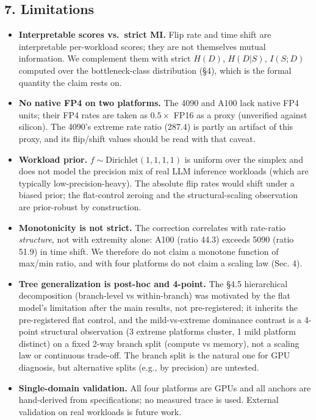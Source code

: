 \documentclass[11pt]{article}
\providecommand{\tightlist}{}
\begin{document}
{{{{\subsection{7. Limitations}\label{limitations}

\begin{itemize}
\tightlist
\item
  \textbf{Interpretable scores vs.~strict MI.} Flip rate and time shift are interpretable per-workload scores; they are not themselves mutual information. We complement them with strict \(H(D)\), \(H(D|S)\), \(I(S;D)\) computed over the bottleneck-class distribution (§4), which is the formal quantity the claim rests on.
\item
  \textbf{No native FP4 on two platforms.} The 4090 and A100 lack native FP4 units; their FP4 rates are taken as \(0.5 \times\) FP16 as a proxy (unverified against silicon). The 4090's extreme rate ratio (287.4) is partly an artifact of this proxy, and its flip/shift values should be read with that caveat.
\item
  \textbf{Workload prior.} \(f \sim \text{Dirichlet}(1,1,1,1)\) is uniform over the simplex and does not model the precision mix of real LLM inference workloads (which are typically low-precision-heavy). The absolute flip rates would shift under a biased prior; the flat-control zeroing and the structural-scaling observation are prior-robust by construction.
\item
  \textbf{Monotonicity is not strict.} The correction correlates with rate-ratio \emph{structure}, not with extremity alone: A100 (ratio 44.3) exceeds 5090 (ratio 51.9) in time shift. We therefore do not claim a monotone function of max/min ratio, and with four platforms do not claim a scaling law (Sec. 4).
\item
  \textbf{Tree generalization is post-hoc and 4-point.} The §4.5 hierarchical decomposition (branch-level vs within-branch) was motivated by the flat model's limitation after the main results, not pre-registered; it inherits the pre-registered flat control, and the mild-vs-extreme dominance contrast is a 4-point structural observation (3 extreme platforms cluster, 1 mild platform distinct) on a fixed 2-way branch split (compute vs memory), not a scaling law or continuous trade-off. The branch split is the natural one for GPU diagnosis, but alternative splits (e.g., by precision) are untested.
\item
  \textbf{Single-domain validation.} All four platforms are GPUs and all anchors are hand-derived from specifications; no measured trace is used. External validation on real workloads is future work.

\end{itemize}}}}}
\end{document}
